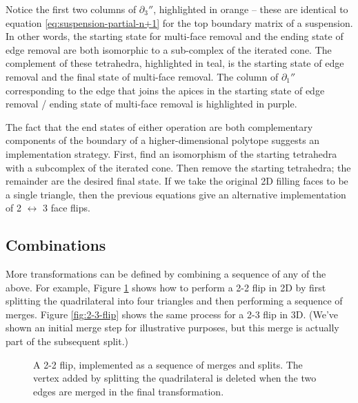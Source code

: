 \documentclass[twocolumn]{article}
\begin{document}
Notice the first two columns of $\partial_3''$, highlighted in orange -- these are identical to equation \eqref{eq:suspension-partial-n+1} for the top boundary matrix of a suspension.
In other words, the starting state for multi-face removal and the ending state of edge removal are both isomorphic to a sub-complex of the iterated cone.
The complement of these tetrahedra, highlighted in teal, is the starting state of edge removal and the final state of multi-face removal.
The column of $\partial_1''$ corresponding to the edge that joins the apices in the starting state of edge removal / ending state of multi-face removal is highlighted in purple.

The fact that the end states of either operation are both complementary components of the boundary of a higher-dimensional polytope suggests an implementation strategy.
First, find an isomorphism of the starting tetrahedra with a subcomplex of the iterated cone.
Then remove the starting tetrahedra; the remainder are the desired final state.
If we take the original 2D filling faces to be a single triangle, then the previous equations give an alternative implementation of 2 $\leftrightarrow$ 3 face flips.

\subsection{Combinations}

More transformations can be defined by combining a sequence of any of the above.
For example, Figure \ref{fig:2-2-flip} shows how to perform a 2-2 flip in 2D by first splitting the quadrilateral into four triangles and then performing a sequence of merges.
Figure \ref{fig:2-3-flip} shows the same process for a 2-3 flip in 3D.
(We've shown an initial merge step for illustrative purposes, but this merge is actually part of the subsequent split.)

\begin{figure}[h]

    \begin{center}
        
    \end{center}
    \caption{A 2-2 flip, implemented as a sequence of merges and splits.
    The vertex added by splitting the quadrilateral is deleted when the two edges are merged in the final transformation.}
    \label{fig:2-2-flip}
\end{figure}
\end{document}
